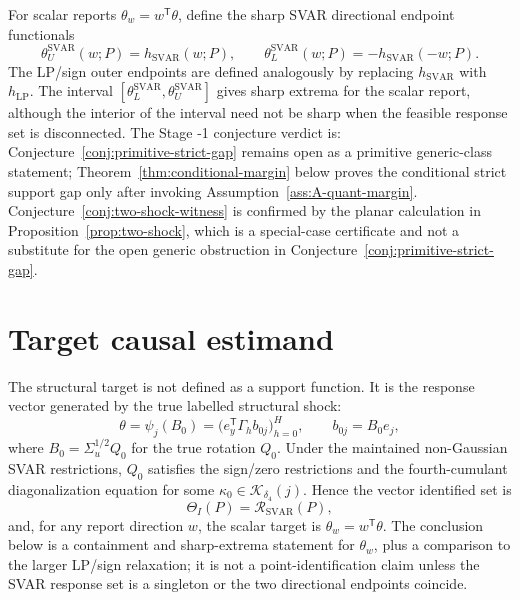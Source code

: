 \documentclass[11pt]{article}
\newcommand{\transpose}{\mathsf{T}}
\theoremstyle{definition}
\theoremstyle{plain}
\theoremstyle{remark}
\begin{document}
For scalar reports \(\theta_w=w^\transpose\theta\), define the sharp SVAR
directional endpoint functionals
\[
\theta_U^{\mathrm{SVAR}}(w;P)=h_{\mathrm{SVAR}}(w;P),\qquad
\theta_L^{\mathrm{SVAR}}(w;P)=-h_{\mathrm{SVAR}}(-w;P).
\]
The LP/sign outer endpoints are defined analogously by replacing
\(h_{\mathrm{SVAR}}\) with \(h_{\mathrm{LP}}\).  The interval
\([\theta_L^{\mathrm{SVAR}},\theta_U^{\mathrm{SVAR}}]\) gives sharp extrema
for the scalar report, although the interior of the interval need not be sharp
when the feasible response set is disconnected.  The Stage -1 conjecture
verdict is: Conjecture~\ref{conj:primitive-strict-gap} remains open as a
primitive generic-class statement; Theorem~\ref{thm:conditional-margin} below
proves the conditional strict support gap only after invoking
Assumption~\ref{ass:A-quant-margin}.  Conjecture~\ref{conj:two-shock-witness}
is confirmed by the planar calculation in Proposition~\ref{prop:two-shock},
which is a special-case certificate and not a substitute for the open generic
obstruction in Conjecture~\ref{conj:primitive-strict-gap}.

\section{Target causal estimand}
The structural target is not defined as a support function.  It is the
response vector generated by the true labelled structural shock:
\[
\theta=\psi_j(B_0)=
\bigl(e_y^\transpose\Gamma_h b_{0j}\bigr)_{h=0}^H,
\qquad b_{0j}=B_0e_j,
\]
where \(B_0=\Sigma_u^{1/2}Q_0\) for the true rotation \(Q_0\).  Under the
maintained non-Gaussian SVAR restrictions, \(Q_0\) satisfies the sign/zero
restrictions and the fourth-cumulant diagonalization equation for some
\(\kappa_0\in\mathcal K_{\delta_4}(j)\).  Hence the vector identified set is
\[
\Theta_I(P)=\mathcal R_{\mathrm{SVAR}}(P),
\]
and, for any report direction \(w\), the scalar target is
\(\theta_w=w^\transpose\theta\).  The conclusion below is a containment and
sharp-extrema statement for \(\theta_w\), plus a comparison to the larger
LP/sign relaxation; it is not a point-identification claim unless the SVAR
response set is a singleton or the two directional endpoints coincide.
\end{document}
